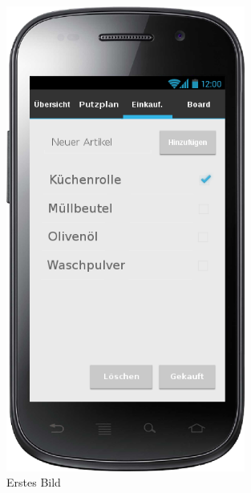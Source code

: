 \begin{figure}[htbp] 
  \centering
     \includegraphics[width=0.7\textwidth]{anhang/mockups/einkaufsliste.png}
  \caption{Erstes Bild}
  \label{fig:Bild1}
\end{figure}

